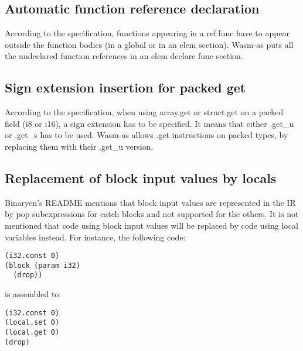 \documentclass[a4paper,11pt]{article}
\begin{document}
\subsection{Automatic function reference declaration}
According to the specification, functions appearing in a \textsf{ref.func} have to
appear outside the function bodies (in a global or in an elem section). Wasm-as
puts all the undeclared function references in an \textsf{elem declare func} section.

\subsection{Sign extension insertion for packed get}
According to the specification, when using \textsf{array.get} or
\textsf{struct.get} on a packed field (\textsf{i8} or \textsf{i16}), a sign
extension has to be specified. It means that either \textsf{.get\_u} or
\textsf{.get\_s} has to be used. Wasm-as allows \textsf{.get} instructions on
packed types, by replacing them with their \textsf{.get\_u} version.

\subsection{Replacement of block input values by locals}
Binaryen's README mentions that block input values are represented in the IR by
\textsf{pop} subexpressions for \textsf{catch} blocks and not supported for the
others. It is not mentioned that code using block input values will be replaced
by code using local variables instead. For instance, the following code:
\begin{lstlisting}
(i32.const 0)
(block (param i32)
  (drop))
\end{lstlisting}
is assembled to:
\begin{lstlisting}
(i32.const 0)
(local.set 0)
(local.get 0)
(drop)
\end{lstlisting}
\end{document}
